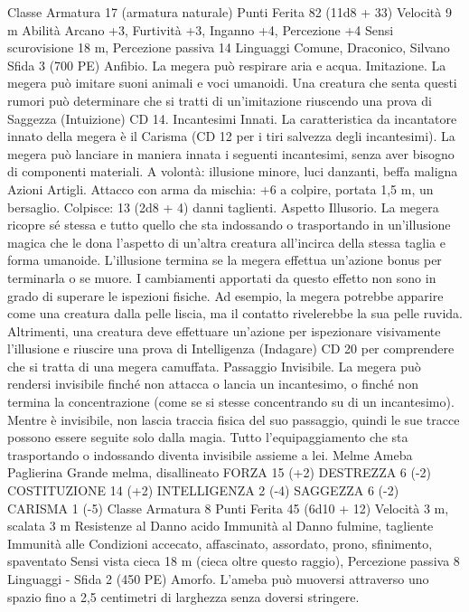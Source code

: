 \begin{multicols}{2}
Classe Armatura 17 (armatura naturale)
Punti Ferita 82 (11d8 + 33)
Velocità 9 m
Abilità Arcano +3, Furtività +3, Inganno +4, Percezione +4
Sensi scurovisione 18 m, Percezione passiva 14
Linguaggi Comune, Draconico, Silvano
Sfida 3 (700 PE)
Anfibio. La megera può respirare aria e acqua.
Imitazione. La megera può imitare suoni animali e voci
umanoidi. Una creatura che senta questi rumori può determinare
che si tratti di un’imitazione riuscendo una prova di Saggezza
(Intuizione) CD 14.
Incantesimi Innati. La caratteristica da incantatore innato della
megera è il Carisma (CD 12 per i tiri salvezza degli incantesimi).
La megera può lanciare in maniera innata i seguenti incantesimi,
senza aver bisogno di componenti materiali.
A volontà: illusione minore, luci danzanti, beffa maligna
Azioni
Artigli. Attacco con arma da mischia: +6 a colpire, portata 1,5
m, un bersaglio.
Colpisce: 13 (2d8 + 4) danni taglienti.
Aspetto Illusorio. La megera ricopre sé stessa e tutto quello che
sta indossando o trasportando in un’illusione magica che le dona
l’aspetto di un’altra creatura all’incirca della stessa taglia e forma
umanoide. L’illusione termina se la megera effettua un’azione
bonus per terminarla o se muore.
I cambiamenti apportati da questo effetto non sono in grado di
superare le ispezioni fisiche. Ad esempio, la megera potrebbe
apparire come una creatura dalla pelle liscia, ma il contatto
rivelerebbe la sua pelle ruvida. Altrimenti, una creatura deve
effettuare un’azione per ispezionare visivamente l’illusione e
riuscire una prova di Intelligenza (Indagare) CD 20 per
comprendere che si tratta di una megera camuffata.
Passaggio Invisibile. La megera può rendersi invisibile finché
non attacca o lancia un incantesimo, o finché non termina la
concentrazione (come se si stesse concentrando su di un
incantesimo). Mentre è invisibile, non lascia traccia fisica del suo
passaggio, quindi le sue tracce possono essere seguite solo dalla
magia. Tutto l’equipaggiamento che sta trasportando o
indossando diventa invisibile assieme a lei.
Melme
Ameba Paglierina
Grande melma, disallineato
FORZA 15 (+2)
DESTREZZA 6 (-2)
COSTITUZIONE 14 (+2)
INTELLIGENZA 2 (-4)
SAGGEZZA 6 (-2)
CARISMA 1 (-5)
Classe Armatura 8
Punti Ferita 45 (6d10 + 12)
Velocità 3 m, scalata 3 m
Resistenze al Danno acido
Immunità al Danno fulmine, tagliente
Immunità alle Condizioni accecato, affascinato, assordato,
prono, sfinimento, spaventato
Sensi vista cieca 18 m (cieca oltre questo raggio), Percezione
passiva 8
Linguaggi -
Sfida 2 (450 PE)
Amorfo. L’ameba può muoversi attraverso uno spazio fino a 2,5
centimetri di larghezza senza doversi stringere.

\end{multicols}
